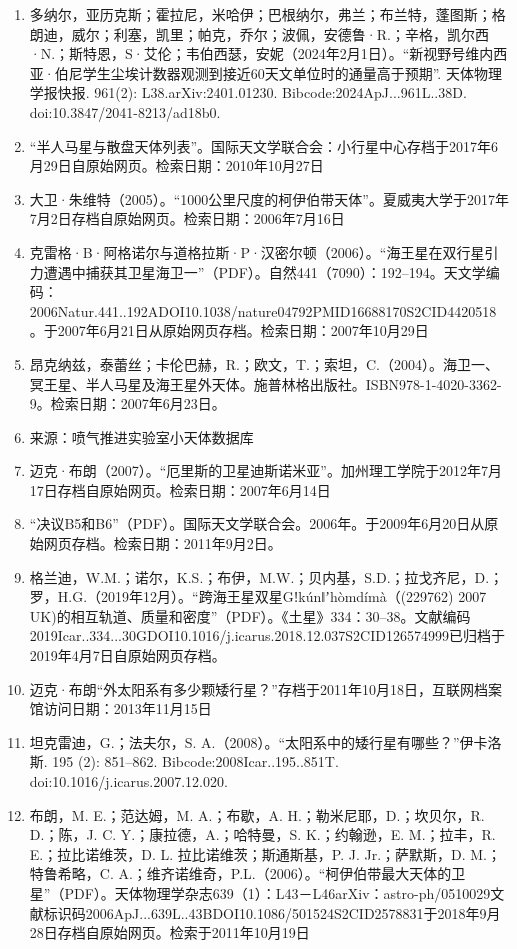 \begin{enumerate}
\item 多纳尔，亚历克斯；霍拉尼，米哈伊；巴根纳尔，弗兰；布兰特，蓬图斯；格朗迪，威尔；利塞，凯里；帕克，乔尔；波佩，安德鲁·R.；辛格，凯尔西·N.；斯特恩，S·艾伦；韦伯西瑟，安妮（2024年2月1日）。“新视野号维内西亚·伯尼学生尘埃计数器观测到接近60天文单位时的通量高于预期”. 天体物理学报快报. 961(2): L38.arXiv:2401.01230. Bibcode:2024ApJ...961L..38D. doi:10.3847/2041-8213/ad18b0.
\item “半人马星与散盘天体列表”。国际天文学联合会：小行星中心存档于2017年6月29日自原始网页。检索日期：2010年10月27日
\item 大卫·朱维特（2005）。“1000公里尺度的柯伊伯带天体”。夏威夷大学于2017年7月2日存档自原始网页。检索日期：2006年7月16日
\item 克雷格·B·阿格诺尔与道格拉斯·P·汉密尔顿（2006）。“海王星在双行星引力遭遇中捕获其卫星海卫一”（PDF）。自然441（7090）：192–194。天文学编码：2006Natur.441..192ADOI10.1038/nature04792PMID16688170S2CID4420518。于2007年6月21日从原始网页存档。检索日期：2007年10月29日
\item 昂克纳兹，泰蕾丝；卡伦巴赫，R.；欧文，T.；索坦，C.（2004）。海卫一、冥王星、半人马星及海王星外天体。施普林格出版社。ISBN978-1-4020-3362-9。检索日期：2007年6月23日。
\item 来源：喷气推进实验室小天体数据库
\item 迈克·布朗（2007）。“厄里斯的卫星迪斯诺米亚”。加州理工学院于2012年7月17日存档自原始网页。检索日期：2007年6月14日
\item “决议B5和B6”（PDF）。国际天文学联合会。2006年。于2009年6月20日从原始网页存档。检索日期：2011年9月2日。
\item 格兰迪，W.M.；诺尔，K.S.；布伊，M.W.；贝内基，S.D.；拉戈齐尼，D.；罗，H.G.（2019年12月）。“跨海王星双星Gǃkúnǁʼhòmdímà（(229762) 2007 UK)的相互轨道、质量和密度”（PDF）。《土星》334：30–38。文献编码2019Icar..334...30GDOI10.1016/j.icarus.2018.12.037S2CID126574999已归档于2019年4月7日自原始网页存档。
\item 迈克·布朗“外太阳系有多少颗矮行星？”存档于2011年10月18日，互联网档案馆访问日期：2013年11月15日
\item 坦克雷迪，G.；法夫尔，S. A.（2008）。“太阳系中的矮行星有哪些？”伊卡洛斯. 195 (2): 851–862. Bibcode:2008Icar..195..851T. doi:10.1016/j.icarus.2007.12.020.
\item 布朗，M. E.；范达姆，M. A.；布歇，A. H.；勒米尼耶，D.；坎贝尔，R. D.；陈，J. C. Y.；康拉德，A.；哈特曼，S. K.；约翰逊，E. M.；拉丰，R. E.；拉比诺维茨，D. L. 拉比诺维茨；斯通斯基，P. J. Jr.；萨默斯，D. M.；特鲁希略，C. A.；维齐诺维奇，P.L.（2006）。“柯伊伯带最大天体的卫星”（PDF）。天体物理学杂志639（1）：L43－L46arXiv：astro-ph/0510029文献标识码2006ApJ...639L..43BDOI10.1086/501524S2CID2578831于2018年9月28日存档自原始网页。检索于2011年10月19日

\end{enumerate}
